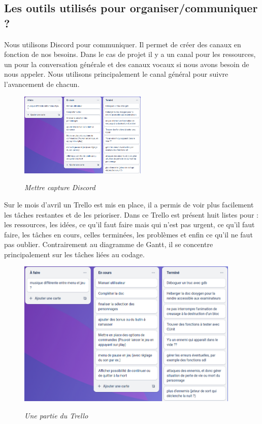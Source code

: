 \documentclass[a4paper,12pt]{article}
\begin{document}
\subsection{Les outils utilisés pour organiser/communiquer ?}
Nous utilisons Discord pour communiquer. 
Il permet de créer des canaux en fonction de nos besoins. 
Dans le cas de projet il y a un canal pour les ressources, un pour la conversation générale et des canaux vocaux si nous avons besoin de nous appeler. 
Nous utilisons principalement le canal général pour suivre l’avancement de chacun.

\begin{figure}[h]
\begin{center}
\includegraphics[height=4cm]{img/capture_trello.png}\\
\caption{{\emph{Mettre capture Discord}}}
\label{discord}
\end{center}
\end{figure}

Sur le mois d’avril un Trello est mis en place, il a permis de voir plus facilement les tâches restantes et de les prioriser. 
Dans ce Trello est présent huit listes pour : les ressources, les idées, ce qu’il faut faire mais qui n’est pas urgent, ce qu’il faut faire, les tâches en cours, celles terminées, les problèmes et enfin ce qu’il ne faut pas oublier. 
Contrairement au diagramme de Gantt, il se concentre principalement sur les tâches liées au codage.

\begin{figure}[h]
\begin{center}
\includegraphics[height=7cm]{img/capture_trello.png}\\
\caption{{\emph{Une partie du Trello}}}
\label{trello}
\end{center}
\end{figure}
\end{document}
